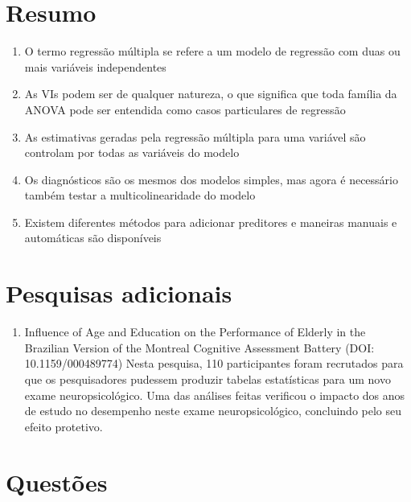 \documentclass[
]{book}
\providecommand{\tightlist}{%
  \setlength{\itemsep}{0pt}\setlength{\parskip}{0pt}}
\begin{document}
\hypertarget{resumo-16}{%
\section{Resumo}\label{resumo-16}}

\begin{enumerate}
\def\labelenumi{\arabic{enumi}.}
\tightlist
\item
  O termo regressão múltipla se refere a um modelo de regressão com duas ou mais variáveis independentes\\
\item
  As VIs podem ser de qualquer natureza, o que significa que toda família da ANOVA pode ser entendida como casos particulares de regressão
\item
  As estimativas geradas pela regressão múltipla para uma variável são controlam por todas as variáveis do modelo\\
\item
  Os diagnósticos são os mesmos dos modelos simples, mas agora é necessário também testar a multicolinearidade do modelo\\
\item
  Existem diferentes métodos para adicionar preditores e maneiras manuais e automáticas são disponíveis\\
\end{enumerate}

\hypertarget{pesquisas-adicionais-9}{%
\section{Pesquisas adicionais}\label{pesquisas-adicionais-9}}

\begin{enumerate}
\def\labelenumi{\arabic{enumi}.}
\tightlist
\item
  Influence of Age and Education on the Performance of Elderly in the Brazilian Version of the Montreal Cognitive Assessment Battery (DOI: 10.1159/000489774)
  Nesta pesquisa, 110 participantes foram recrutados para que os pesquisadores pudessem produzir tabelas estatísticas para um novo exame neuropsicológico. Uma das análises feitas verificou o impacto dos anos de estudo no desempenho neste exame neuropsicológico, concluindo pelo seu efeito protetivo.
\end{enumerate}

\hypertarget{questuxf5es-9}{%
\section{Questões}\label{questuxf5es-9}}
\end{document}
